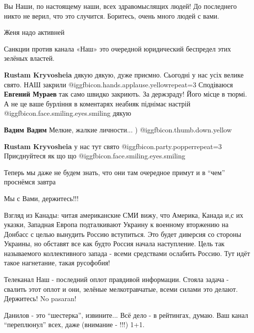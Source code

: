 \begin{itemize}

Вы Наши, по настоящему наши, всех здравомыслящих людей! До последнего никто не
верил, что это случится. Боритесь, очень много людей с вами.


Женя надо активней

Санкции против канала «Наш» это очередной юридический беспредел этих зелёных властей.

\begin{itemize} %
\textbf{Rustam Kryvosheia} дякую дякую, дуже приємно. Сьогодні у нас усіх велике свято. НАШ закрили  @igg{fbicon.hands.applause.yellow}{repeat=3} 
Сподіваюся \textbf{Евгений Мураев} так само швидко закриють. За держзраду! Його місце в тюрмі.
А не це ваше бурління в коментарях неабияк піднімає настрій  @igg{fbicon.face.smiling.eyes.smiling}  дякую

\textbf{Вадим Вадим}
Мелкие, жалкие личности... ) @igg{fbicon.thumb.down.yellow} 

\textbf{Rustam Kryvosheia} у нас тут свято  @igg{fbicon.party.popper}{repeat=3} 
Приєднуйтеся як що що  @igg{fbicon.face.smiling.eyes.smiling} 
\end{itemize} %


Теперь мы даже не будем знать, что они там очередное примут и в \enquote{чем} проснёмся завтра

Мы с Вами, держитесь!!!


Взгляд из Канады: читая американские СМИ вижу, что Америка, Канада и,с их
указки, Западная Европа подталкивают Украину к военному вторжению на Донбасс с
целью вынудить Россию вступиться. Это будет диверсия со стороны Украины, но
обставят все как будто Россия начала наступление. Цель так называемого
коллективного запада - всеми средствами ослабить Россию. Тут идёт такое
нагнетание, такая русофобия!

Телеканал Наш - последний оплот правдивой информации. Стояла задача - свалить
этот оплот и они, зелёные мелкотравчатые, всеми силами это делают. Держитесь!
No pasaran!


Данилов - это \enquote{шестерка}, извините... Всё дело - в рейтингах, думаю.
Ваш канал \enquote{переплюнул} всех, даже (внимание - !!!) 1+1.


\end{itemize}
